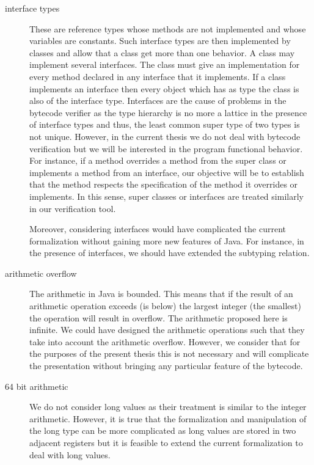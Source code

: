 \begin{description}
   \item [interface types] These are reference types whose methods are not implemented and whose variables are constants.
         Such interface types are then implemented by classes and allow that a class get more than one behavior.
	 A class may implement several interfaces. 
	 The class must give an implementation for every method declared in any interface that it implements.
	 If a class implements an interface then every object which has as type the class is also of the interface type.
	 Interfaces  are the cause of  problems in the bytecode verifier as the type hierarchy is no more a lattice in the 
	 presence of interface types and thus,
	 the least common super type of two types is not unique.
	 However, in the current thesis we do not deal with bytecode verification but 
	 we will be interested in the program functional behavior. For instance, if a method overrides a method
	 from the super class or implements a method from an interface, our objective will be to establish that the method
	 respects the specification of the method it overrides or implements. In this sense, super classes or interfaces
	 are treated similarly in our verification tool.
  
	 Moreover, considering interfaces would have complicated the current formalization 
	 without gaining more new features of Java. 
	 For instance, in the presence of interfaces, we should have extended 
	 the subtyping relation. 

   \item [arithmetic overflow] The arithmetic in Java is  bounded. This means that if the result of an 
         arithmetic operation exceeds (is below) the largest integer (the smallest)  the operation will
	 result in overflow. The arithmetic proposed here is infinite. We could have designed the arithmetic
	 operations such that they take into account the arithmetic overflow. 
	 However, we consider that for the purposes of the present thesis this is not necessary and will 
	 complicate the presentation without bringing any particular feature of the bytecode. 
	 

   \item [64 bit arithmetic]  We do not consider  
	  long values as their treatment is similar to the integer arithmetic.
	  However, it is true that the formalization and manipulation of the long type can be more complicated as
	  long values are stored in two adjacent registers but it is feasible to extend the current formalization 
	  to deal with long values.


\end{description}
